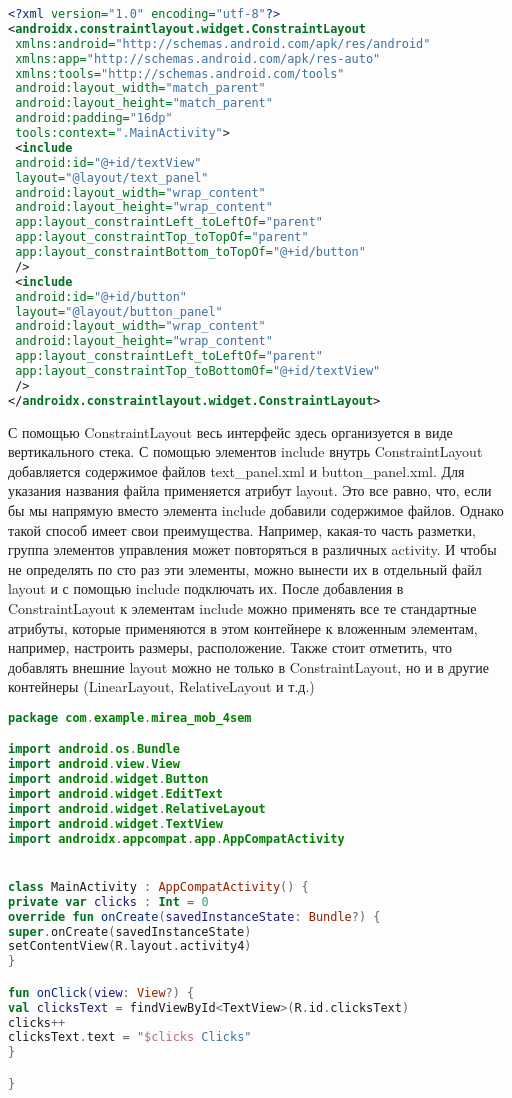 \begin{lstlisting}[language=xml, caption=\leftline{xml}, label=lst:text_panel.xml]
<?xml version="1.0" encoding="utf-8"?>
<androidx.constraintlayout.widget.ConstraintLayout
 xmlns:android="http://schemas.android.com/apk/res/android"
 xmlns:app="http://schemas.android.com/apk/res-auto"
 xmlns:tools="http://schemas.android.com/tools"
 android:layout_width="match_parent"
 android:layout_height="match_parent"
 android:padding="16dp"
 tools:context=".MainActivity">
 <include
 android:id="@+id/textView"
 layout="@layout/text_panel"
 android:layout_width="wrap_content"
 android:layout_height="wrap_content"
 app:layout_constraintLeft_toLeftOf="parent"
 app:layout_constraintTop_toTopOf="parent"
 app:layout_constraintBottom_toTopOf="@+id/button"
 />
 <include
 android:id="@+id/button"
 layout="@layout/button_panel"
 android:layout_width="wrap_content"
 android:layout_height="wrap_content"
 app:layout_constraintLeft_toLeftOf="parent"
 app:layout_constraintTop_toBottomOf="@+id/textView"
 />
</androidx.constraintlayout.widget.ConstraintLayout>
\end{lstlisting}
С помощью ConstraintLayout весь интерфейс здесь организуется в виде
вертикального стека. С помощью элементов include внутрь ConstraintLayout
добавляется содержимое файлов text\_panel.xml и button\_panel.xml. Для
указания названия файла применяется атрибут layout.
Это все равно, что, если бы мы напрямую вместо элемента include добавили
содержимое файлов. Однако такой способ имеет свои преимущества.
Например, какая-то часть разметки, группа элементов управления может
повторяться в различных activity. И чтобы не определять по сто раз эти
элементы, можно вынести их в отдельный файл layout и с помощью include
подключать их.
После добавления в ConstraintLayout к элементам include можно применять
все те стандартные атрибуты, которые применяются в этом контейнере к
вложенным элементам, например, настроить размеры, расположение. Также
стоит отметить, что добавлять внешние layout можно не только в
ConstraintLayout, но и в другие контейнеры (LinearLayout, RelativeLayout и
т.д.)
\begin{lstlisting}[language=Kotlin, caption=\leftline{Kotlin}, label=lst:clicks]
package com.example.mirea_mob_4sem

import android.os.Bundle
import android.view.View
import android.widget.Button
import android.widget.EditText
import android.widget.RelativeLayout
import android.widget.TextView
import androidx.appcompat.app.AppCompatActivity


class MainActivity : AppCompatActivity() {
private var clicks : Int = 0
override fun onCreate(savedInstanceState: Bundle?) {
super.onCreate(savedInstanceState)
setContentView(R.layout.activity4)
}

fun onClick(view: View?) {
val clicksText = findViewById<TextView>(R.id.clicksText)
clicks++
clicksText.text = "$clicks Clicks"
}

}
\end{lstlisting}
